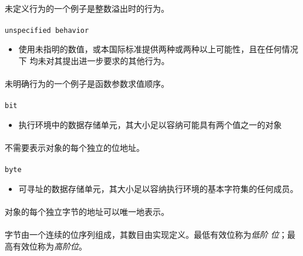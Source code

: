 \paragraph{}
\ex* 未定义行为的一个例子是整数溢出时的行为。

\paragraph{}
\texttt{unspecified behavior}
\begin{itemize}
  \item[]{使用未指明的数值，或本国际标准提供两种或两种以上可能性，且在任何情况下
    均未对其提出进一步要求的其他行为。}
\end{itemize}

\paragraph{}
\ex* 未明确行为的一个例子是函数参数求值顺序。

\paragraph{}
\texttt{bit}
\begin{itemize}
  \item[]{执行环境中的数据存储单元，其大小足以容纳可能具有两个值之一的对象}
\end{itemize}

\paragraph{}
\notes* 不需要表示对象的每个独立的位地址。

\paragraph{}
\texttt{byte}
\begin{itemize}
  \item[]{可寻址的数据存储单元，其大小足以容纳执行环境的基本字符集的任何成员。}
\end{itemize}

\paragraph{}
\notes 对象的每个独立字节的地址可以唯一地表示。

\paragraph{}
\notes 字节由一个连续的位序列组成，其数目由实现定义。最低有效位称为\textit{低阶
位}；最高有效位称为\textit{高阶位}。

